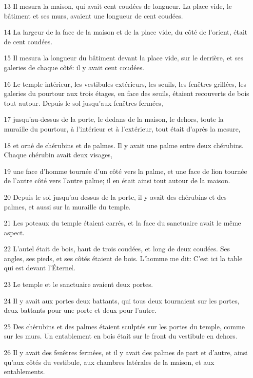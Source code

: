\par 13 Il mesura la maison, qui avait cent coudées de longueur. La place vide, le bâtiment et ses murs, avaient une longueur de cent coudées.
\par 14 La largeur de la face de la maison et de la place vide, du côté de l'orient, était de cent coudées.
\par 15 Il mesura la longueur du bâtiment devant la place vide, sur le derrière, et ses galeries de chaque côté: il y avait cent coudées.
\par 16 Le temple intérieur, les vestibules extérieurs, les seuils, les fenêtres grillées, les galeries du pourtour aux trois étages, en face des seuils, étaient recouverts de bois tout autour. Depuis le sol jusqu'aux fenêtres fermées,
\par 17 jusqu'au-dessus de la porte, le dedans de la maison, le dehors, toute la muraille du pourtour, à l'intérieur et à l'extérieur, tout était d'après la mesure,
\par 18 et orné de chérubins et de palmes. Il y avait une palme entre deux chérubins. Chaque chérubin avait deux visages,
\par 19 une face d'homme tournée d'un côté vers la palme, et une face de lion tournée de l'autre côté vers l'autre palme; il en était ainsi tout autour de la maison.
\par 20 Depuis le sol jusqu'au-dessus de la porte, il y avait des chérubins et des palmes, et aussi sur la muraille du temple.
\par 21 Les poteaux du temple étaient carrés, et la face du sanctuaire avait le même aspect.
\par 22 L'autel était de bois, haut de trois coudées, et long de deux coudées. Ses angles, ses pieds, et ses côtés étaient de bois. L'homme me dit: C'est ici la table qui est devant l'Éternel.
\par 23 Le temple et le sanctuaire avaient deux portes.
\par 24 Il y avait aux portes deux battants, qui tous deux tournaient sur les portes, deux battants pour une porte et deux pour l'autre.
\par 25 Des chérubins et des palmes étaient sculptés sur les portes du temple, comme sur les murs. Un entablement en bois était sur le front du vestibule en dehors.
\par 26 Il y avait des fenêtres fermées, et il y avait des palmes de part et d'autre, ainsi qu'aux côtés du vestibule, aux chambres latérales de la maison, et aux entablements.


